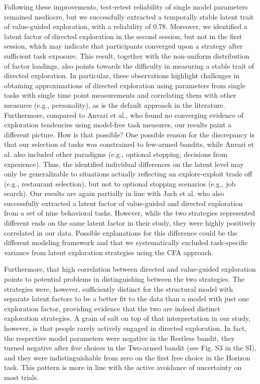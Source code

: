 \documentclass[fleqn,10pt]{wlscirep}
\begin{document}
Following these improvements, test-retest reliability of single model parameters remained mediocre, but we successfully extracted a temporally stable latent trait of value-guided exploration, with a reliability of 0.78. Moreover, we identified a latent factor of directed exploration in the second session, but not in the first session, which may indicate that participants converged upon a strategy after sufficient task exposure. This result, together with the non-uniform distribution of factor loadings, also points towards the difficulty in measuring a stable trait of directed exploration. In particular, these observations highlight challenges in obtaining approximations of directed exploration using parameters from single tasks with single time point measurements and correlating them with other measures (e.g., personality), as is the default approach in the literature. Furthermore, compared to Anvari et al.\cite{anvari2024testing}, who found no converging evidence of exploration tendencies using model-free task measures, our results paint a different picture. How is that possible? One possible reason for the discrepancy is that our selection of tasks was constrained to few-armed bandits, while Anvari et al. also included other paradigms (e.g., optional stopping, decisions from experience). Thus, the identified individual differences on the latent level may only be generalizable to situations actually reflecting an explore-exploit trade off (e.g., restaurant selection), but not to optional stopping scenarios (e.g., job search). Our results are again partially in line with Jach et al.  \cite{jach2024individual} who also successfully extracted a latent factor of value-guided and directed exploration from a set of nine behavioral tasks. However, while the two strategies represented different ends on the same latent factor in their study, they were highly positively correlated in our data. Possible explanations for this difference could be the different modeling framework and that we systematically excluded task-specific variance from latent exploration strategies using the CFA approach.

Furthermore, that high correlation between directed and value-guided exploration points to potential problems in distinguishing between the two strategies. The strategies were, however, sufficiently distinct for the structural model with separate latent factors to be a better fit to the data than a model with just one exploration factor, providing evidence that the two are indeed distinct exploration strategies. A grain of salt on top of that interpretation in our study, however, is that people rarely actively engaged in directed exploration. In fact, the respective model parameters were negative in the Restless bandit, they turned negative after five choices in the Two-armed bandit (see Fig. S3 in the SI), and they were indistinguishable from zero on the first free choice in the Horizon task. This pattern is more in line with the active avoidance of uncertainty on most trials.
\end{document}
